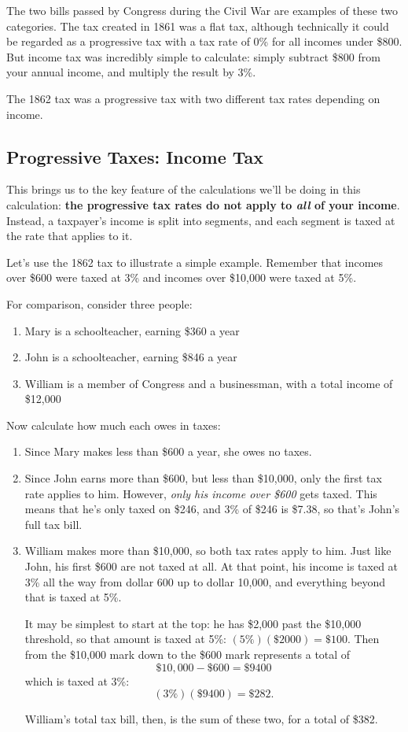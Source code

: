 The two bills passed by Congress during the Civil War are examples of these two categories.  The tax created in 1861 was a flat tax, although technically it could be regarded as a progressive tax with a tax rate of 0\% for all incomes under \$800.  But income tax was incredibly simple to calculate: simply subtract \$800 from your annual income, and multiply the result by 3\%.

The 1862 tax was a progressive tax with two different tax rates depending on income.

\subsection{Progressive Taxes: Income Tax}
This brings us to the key feature of the calculations we'll be doing in this calculation: \textbf{the progressive tax rates do not apply to \emph{all} of your income}.  Instead, a taxpayer's income is split into segments, and each segment is taxed at the rate that applies to it.

Let's use the 1862 tax to illustrate a simple example.  Remember that incomes over \$600 were taxed at 3\% and incomes over \$10,000 were taxed at 5\%.

For comparison, consider three people:
\begin{enumerate}
\item Mary is a schoolteacher, earning \$360 a year
\item John is a schoolteacher, earning \$846 a year
\item William is a member of Congress and a businessman, with a total income of \$12,000
\end{enumerate}

Now calculate how much each owes in taxes:
\begin{enumerate}
\item Since Mary makes less than \$600 a year, she owes no taxes.
\item Since John earns more than \$600, but less than \$10,000, only the first tax rate applies to him.  However, \emph{only his income over \$600} gets taxed.  This means that he's only taxed on \$246, and 3\% of \$246 is \$7.38, so that's John's full tax bill.
\item William makes more than \$10,000, so both tax rates apply to him.  Just like John, his first \$600 are not taxed at all.  At that point, his income is taxed at 3\% all the way from dollar 600 up to dollar 10,000, and everything beyond that is taxed at 5\%.

It may be simplest to start at the top: he has \$2,000 past the \$10,000 threshold, so that amount is taxed at 5\%: $(5\%)(\$2000) = \$100$.  Then from the \$10,000 mark down to the \$600 mark represents a total of \[\$10,000 - \$600 = \$9400\] which is taxed at 3\%:
\[(3\%)(\$9400) = \$282.\]

William's total tax bill, then, is the sum of these two, for a total of \$382.
\end{enumerate}

